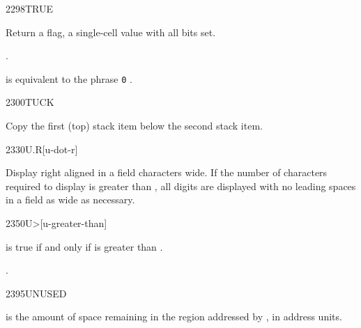 \begin{worddef}{2298}{TRUE}
\item {}

	Return a  flag, a single-cell value with all
	bits set.

\see {}.

	\begin{defer}
	\rationale %
		 is equivalent to the phrase
		\texttt{0} .
	\end{defer}
\end{worddef}


\begin{worddef}{2300}{TUCK}
\item {}

	Copy the first (top) stack item below the second stack item.
\end{worddef}


\begin{worddef}{2330}{U.R}[u-dot-r]
\item {}

	Display  right aligned in a field  characters
	wide. If the number of characters required to display 
	is greater than , all digits are displayed with no leading
	spaces in a field as wide as necessary.
\end{worddef}


\begin{worddef}[Umore]{2350}{U>}[u-greater-than]
\item {}

	 is true if and only if  is greater than
	.

\see {}.
\end{worddef}


\begin{worddef}{2395}{UNUSED}
\item {}

	 is the amount of space remaining in the region addressed
	by , in address units.
\end{worddef}



